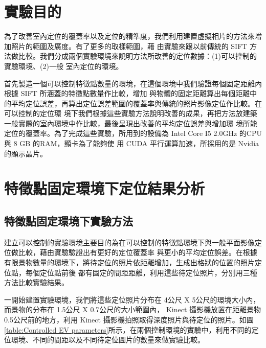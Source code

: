 

\section{實驗目的}
	
	為了改善室內定位的覆蓋率以及定位的精準度，我們利用建置虛擬相片的方法來增加照片的範圍及廣度。有了更多的取樣範圍，藉
由實驗來跟以前傳統的 SIFT 方法做比較。我們分成兩個實驗環境來說明方法所改善的定位數據：(1)可以控制的實驗環境、(2)一般
室內定位的環境。

	首先製造一個可以控制特徵點數量的環境，在這個環境中我們驗證每個固定距離內根據 SIFT 所涵蓋的特徵點數量作比較，增加
與物體的固定距離算出每個距離中的平均定位誤差，再算出定位誤差範圍的覆蓋率與傳統的照片影像定位作比較。在可以控制的定位環
境下我們根據這些實驗方法說明改善的成果，再把方法放建築一般實際的室內環境中作比較，最後呈現出改善的平均定位誤差與增加環
境所能定位的覆蓋率。為了完成這些實驗，所用到的設備為  Intel Core I5 2.0GHz 的CPU與 8 GB 的RAM，顯卡為了能夠使
用 CUDA 平行運算加速，所採用的是 Nvidia 的顯示晶片。

\section{特徵點固定環境下定位結果分析}


\subsection{特徵點固定環境下實驗方法}
	建立可以控制的實驗環境主要目的為在可以控制的特徵點環境下與一般平面影像定位做比較，藉由實驗驗證出有更好的定位覆蓋率
與更小的平均定位誤差。在根據有限景物數量的環境下，將待定位的照片依距離增加，生成出格狀的位置的照片定位點，每個定位點前後
都有固定的間距距離，利用這些待定位照片，分別用三種方法比較實驗結果。

	一開始建置實驗環境，我們將這些定位照片分布在 4公尺 X 5公尺的環境大小內，而景物的分布在 1.5公尺 X 0.7公尺的大小範圍內， 
Kinect 攝影機放置在距離景物 0.5公尺前的地方，利用 Kinect 攝影機拍照取得深度照片與待定位的照片。如圖\ref{table:Controlled 
EV parameters}所示，在兩個控制環境的實驗中，利用不同的定位環境、不同的間距以及不同待定位圖片的數量來做實驗比較。
		
		
		
